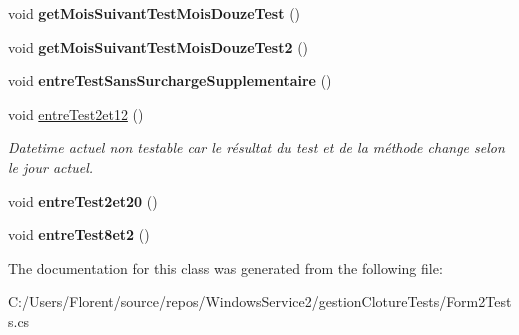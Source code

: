 \begin{DoxyCompactItemize}
\mbox{\label{classgestion_cloture_1_1_tests_1_1_form2_tests_ae8718aa9efe29a05e9a40a439a937639}} 
void {\bfseries get\+Mois\+Suivant\+Test\+Mois\+Douze\+Test} ()
\item 
\mbox{\label{classgestion_cloture_1_1_tests_1_1_form2_tests_a5f1d13e84b2452a2d848c311aa3b92c7}} 
void {\bfseries get\+Mois\+Suivant\+Test\+Mois\+Douze\+Test2} ()
\item 
\mbox{\label{classgestion_cloture_1_1_tests_1_1_form2_tests_a5f6df5b86baccd92be6cd8cd98c430fa}} 
void {\bfseries entre\+Test\+Sans\+Surcharge\+Supplementaire} ()
\item 
\mbox{\label{classgestion_cloture_1_1_tests_1_1_form2_tests_ad3fa2668c049d4801c7c19ec2248b736}} 
void \mbox{\hyperlink{classgestion_cloture_1_1_tests_1_1_form2_tests_ad3fa2668c049d4801c7c19ec2248b736}{entre\+Test2et12}} ()
\begin{DoxyCompactList}\small\item\em Datetime actuel non testable car le résultat du test et de la méthode change selon le jour actuel. \end{DoxyCompactList}\item 
\mbox{\label{classgestion_cloture_1_1_tests_1_1_form2_tests_a0f6b1466c06393f9fcfcd780c0b607a9}} 
void {\bfseries entre\+Test2et20} ()
\item 
\mbox{\label{classgestion_cloture_1_1_tests_1_1_form2_tests_a9008295c5e26657b549a34892b73ade9}} 
void {\bfseries entre\+Test8et2} ()
\end{DoxyCompactItemize}


The documentation for this class was generated from the following file\+:\begin{DoxyCompactItemize}
\item 
C\+:/\+Users/\+Florent/source/repos/\+Windows\+Service2/gestion\+Cloture\+Tests/Form2\+Tests.\+cs\end{DoxyCompactItemize}
